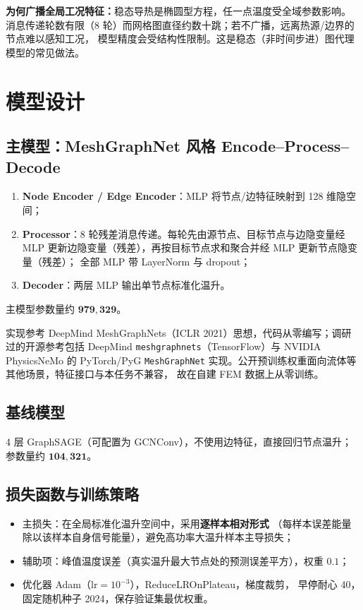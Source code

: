 \documentclass[11pt,a4paper]{article}
\begin{document}
\textbf{为何广播全局工况特征：}稳态导热是椭圆型方程，任一点温度受全域参数影响。
消息传递轮数有限（8 轮）而网格图直径约数十跳；若不广播，远离热源/边界的节点难以感知工况，
模型精度会受结构性限制。这是稳态（非时间步进）图代理模型的常见做法。


\section{模型设计}

\subsection{主模型：MeshGraphNet 风格 Encode--Process--Decode}
\begin{enumerate}[leftmargin=1.5em]
  \item \textbf{Node Encoder / Edge Encoder}：MLP 将节点/边特征映射到 128 维隐空间；
  \item \textbf{Processor}：8 轮残差消息传递。每轮先由源节点、目标节点与边隐变量经 MLP
  更新边隐变量（残差），再按目标节点求和聚合并经 MLP 更新节点隐变量（残差）；
  全部 MLP 带 LayerNorm 与 dropout；
  \item \textbf{Decoder}：两层 MLP 输出单节点标准化温升。
\end{enumerate}
主模型参数量约 \(\mathbf{979{,}329}\)。

实现参考 DeepMind MeshGraphNets（ICLR 2021）思想，代码从零编写；调研过的开源参考包括
DeepMind \texttt{meshgraphnets}（TensorFlow）与 NVIDIA PhysicsNeMo 的 PyTorch/PyG
\texttt{MeshGraphNet} 实现。公开预训练权重面向流体等其他场景，特征接口与本任务不兼容，
故在自建 FEM 数据上从零训练。

\subsection{基线模型}
4 层 GraphSAGE（可配置为 GCNConv），不使用边特征，直接回归节点温升；
参数量约 \(\mathbf{104{,}321}\)。

\subsection{损失函数与训练策略}
\begin{itemize}[leftmargin=1.5em]
  \item 主损失：在全局标准化温升空间中，采用\textbf{逐样本相对形式}
  （每样本误差能量除以该样本自身信号能量），避免高功率大温升样本主导损失；
  \item 辅助项：峰值温度误差（真实温升最大节点处的预测误差平方），权重 \(0.1\)；
  \item 优化器 Adam（\(\mathrm{lr}=10^{-3}\)），ReduceLROnPlateau，梯度裁剪，
  早停耐心 40，固定随机种子 2024，保存验证集最优权重。
\end{itemize}
\end{document}
